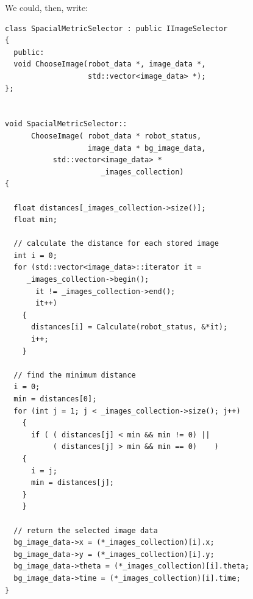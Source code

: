 We could, then, write:
\begin{lstlisting}[caption={A possible \texttt{ChooseImage} implementation}, label={code:chooseimage_impl}, frame=trBL]
class SpacialMetricSelector : public IImageSelector
{
  public:
  void ChooseImage(robot_data *, image_data *, 
                   std::vector<image_data> *);
};


void SpacialMetricSelector::
      ChooseImage( robot_data * robot_status, 
                   image_data * bg_image_data,
		   std::vector<image_data> * 
                      _images_collection)
{

  float distances[_images_collection->size()];
  float min;

  // calculate the distance for each stored image
  int i = 0;
  for (std::vector<image_data>::iterator it =
	 _images_collection->begin();
       it != _images_collection->end();
       it++)
    {
      distances[i] = Calculate(robot_status, &*it);
      i++;
    }

  // find the minimum distance
  i = 0;
  min = distances[0];
  for (int j = 1; j < _images_collection->size(); j++)
    {
      if ( ( distances[j] < min && min != 0) || 
           ( distances[j] > min && min == 0)    )
	{
	  i = j;
	  min = distances[j];
	}
    }

  // return the selected image data
  bg_image_data->x = (*_images_collection)[i].x;
  bg_image_data->y = (*_images_collection)[i].y;
  bg_image_data->theta = (*_images_collection)[i].theta;
  bg_image_data->time = (*_images_collection)[i].time;
}
\end{lstlisting}
%
